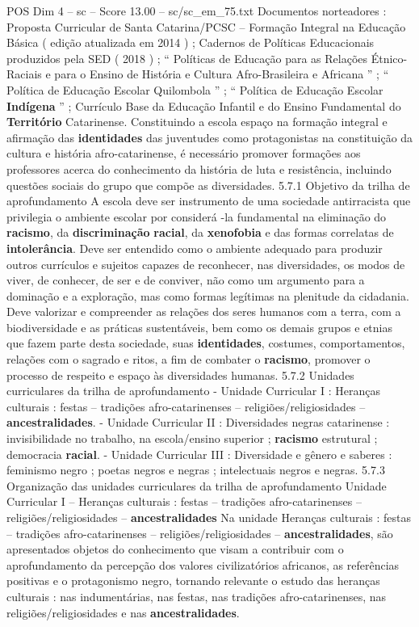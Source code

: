 \begin{textsample}{POS Dim 4 – sc – Score 13.00 – sc/sc\_em\_75.txt}
Documentos norteadores : Proposta Curricular de Santa Catarina/PCSC – Formação Integral na Educação Básica ( edição atualizada em 2014 ) ; Cadernos de Políticas Educacionais produzidos pela SED ( 2018 ) ; “ Políticas de Educação para as Relações Étnico-Raciais e para o Ensino de História e Cultura Afro-Brasileira e Africana ” ; “ Política de Educação Escolar Quilombola ” ; “ Política de Educação Escolar \textbf{Indígena} ” ; Currículo Base da Educação Infantil e do Ensino Fundamental do \textbf{Território} Catarinense.
Constituindo a escola espaço na formação integral e afirmação das \textbf{identidades} das juventudes como protagonistas na constituição da cultura e história afro-catarinense, é necessário promover formações aos professores acerca do conhecimento da história de luta e resistência, incluindo questões sociais do grupo que compõe as diversidades. 5.7.1 Objetivo da trilha de aprofundamento A escola deve ser instrumento de uma sociedade antirracista que privilegia o ambiente escolar por considerá -la fundamental na eliminação do \textbf{racismo}, da \textbf{discriminação} \textbf{racial}, da \textbf{xenofobia} e das formas correlatas de \textbf{intolerância}.
Deve ser entendido como o ambiente adequado para produzir outros currículos e sujeitos capazes de reconhecer, nas diversidades, os modos de viver, de conhecer, de ser e de conviver, não como um argumento para a dominação e a exploração, mas como formas legítimas na plenitude da cidadania.
Deve valorizar e compreender as relações dos seres humanos com a terra, com a biodiversidade e as práticas sustentáveis, bem como os demais grupos e etnias que fazem parte desta sociedade, suas \textbf{identidades}, costumes, comportamentos, relações com o sagrado e ritos, a fim de combater o \textbf{racismo}, promover o processo de respeito e espaço às diversidades humanas. 5.7.2 Unidades curriculares da trilha de aprofundamento - Unidade Curricular I : Heranças culturais : festas – tradições afro-catarinenses – religiões/religiosidades – \textbf{ancestralidades}. - Unidade Curricular II : Diversidades negras catarinense : invisibilidade no trabalho, na escola/ensino superior ; \textbf{racismo} estrutural ; democracia \textbf{racial}. - Unidade Curricular III : Diversidade e gênero e saberes : feminismo negro ; poetas negros e negras ; intelectuais negros e negras. 5.7.3 Organização das unidades curriculares da trilha de aprofundamento Unidade Curricular I – Heranças culturais : festas – tradições afro-catarinenses – religiões/religiosidades – \textbf{ancestralidades} Na unidade Heranças culturais : festas – tradições afro-catarinenses – religiões/religiosidades – \textbf{ancestralidades}, são apresentados objetos do conhecimento que visam a contribuir com o aprofundamento da percepção dos valores civilizatórios africanos, as referências positivas e o protagonismo negro, tornando relevante o estudo das heranças culturais : nas indumentárias, nas festas, nas tradições afro-catarinenses, nas religiões/religiosidades e nas \textbf{ancestralidades}.

\end{textsample}
